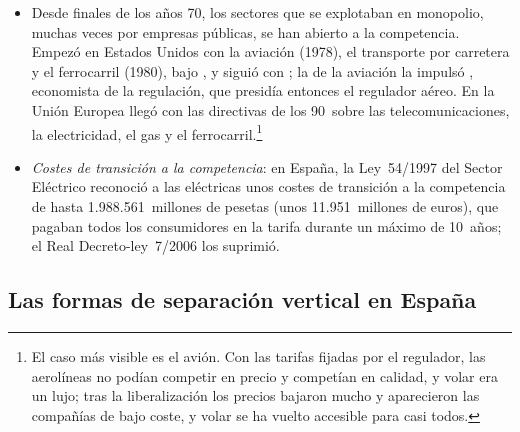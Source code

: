 \documentclass[11pt]{article}
\begin{document}
\begin{itemize}
\item Desde finales de los años 70, los sectores que se explotaban en monopolio, muchas veces por empresas públicas, se han abierto a la competencia. Empezó en Estados Unidos con la aviación (1978), el transporte por carretera y el ferrocarril (1980), bajo , y siguió con \nocite{USC1978AirlineDeregulation,USC1980MotorCarrier,USC1980StaggersRail}; la de la aviación la impulsó , economista de la regulación, que presidía entonces el regulador aéreo\nocite{JoskowNoll2012Kahn}. En la Unión Europea llegó con las directivas de los 90~sobre las telecomunicaciones, la electricidad, el gas y el ferrocarril.\footnote{El caso más visible es el avión. Con las tarifas fijadas por el regulador, las aerolíneas no podían competir en precio y competían en calidad, y volar era un lujo; tras la liberalización los precios bajaron mucho y aparecieron las compañías de bajo coste, y volar se ha vuelto accesible para casi todos.}
\item \emph{Costes de transición a la competencia}: en España, la Ley~54/1997 del Sector Eléctrico reconoció a las eléctricas unos costes de transición a la competencia de hasta 1.988.561~millones de pesetas (unos 11.951~millones de euros), que pagaban todos los consumidores en la tarifa durante un máximo de 10~años\nocite{BOE1997LSE,BOE1997RD2017}; el Real Decreto-ley~7/2006 los suprimió\nocite{BOE2006RDL7}.
\end{itemize}

\subsection{Las formas de separación vertical en España}\label{anexo:separacion-espana}
\end{document}
